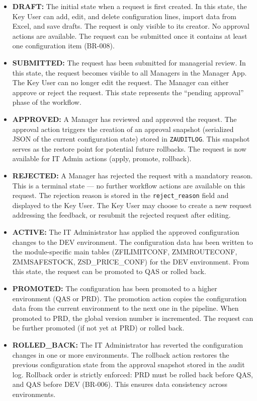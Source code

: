 \documentclass[12pt,a4paper]{report}
\begin{document}
\begin{itemize}[leftmargin=2em]
  \item \textbf{DRAFT:} The initial state when a request is first created. In this state, the Key User can add, edit, and delete configuration lines, import data from Excel, and save drafts. The request is only visible to its creator. No approval actions are available. The request can be submitted once it contains at least one configuration item (BR-008).

  \item \textbf{SUBMITTED:} The request has been submitted for managerial review. In this state, the request becomes visible to all Managers in the Manager App. The Key User can no longer edit the request. The Manager can either approve or reject the request. This state represents the ``pending approval'' phase of the workflow.

  \item \textbf{APPROVED:} A Manager has reviewed and approved the request. The approval action triggers the creation of an approval snapshot (serialized JSON of the current configuration state) stored in \texttt{ZAUDITLOG}. This snapshot serves as the restore point for potential future rollbacks. The request is now available for IT Admin actions (apply, promote, rollback).

  \item \textbf{REJECTED:} A Manager has rejected the request with a mandatory reason. This is a terminal state --- no further workflow actions are available on this request. The rejection reason is stored in the \texttt{reject\_reason} field and displayed to the Key User. The Key User may choose to create a new request addressing the feedback, or resubmit the rejected request after editing.

  \item \textbf{ACTIVE:} The IT Administrator has applied the approved configuration changes to the DEV environment. The configuration data has been written to the module-specific main tables (ZFILIMITCONF, ZMMROUTECONF, ZMMSAFESTOCK, ZSD\_PRICE\_CONF) for the DEV environment. From this state, the request can be promoted to QAS or rolled back.

  \item \textbf{PROMOTED:} The configuration has been promoted to a higher environment (QAS or PRD). The promotion action copies the configuration data from the current environment to the next one in the pipeline. When promoted to PRD, the global version number is incremented. The request can be further promoted (if not yet at PRD) or rolled back.

  \item \textbf{ROLLED\_BACK:} The IT Administrator has reverted the configuration changes in one or more environments. The rollback action restores the previous configuration state from the approval snapshot stored in the audit log. Rollback order is strictly enforced: PRD must be rolled back before QAS, and QAS before DEV (BR-006). This ensures data consistency across environments.
\end{itemize}
\end{document}
